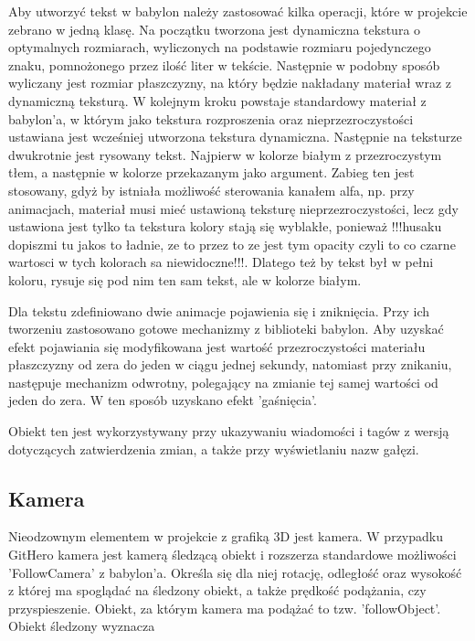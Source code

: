\documentclass[11pt,a4paper,polish,thesis]{dcsbook}
\begin{document}
Aby utworzyć tekst w babylon należy zastosować kilka operacji, które w projekcie zebrano w jedną klasę. Na początku tworzona jest dynamiczna tekstura o optymalnych rozmiarach, wyliczonych na podstawie rozmiaru pojedynczego znaku, pomnożonego przez ilość liter w tekście. Następnie w podobny sposób wyliczany jest rozmiar płaszczyzny, na który będzie nakładany materiał wraz z dynamiczną teksturą. W kolejnym kroku powstaje standardowy materiał z babylon'a, w którym jako tekstura rozproszenia oraz nieprzezroczystości ustawiana jest wcześniej utworzona tekstura dynamiczna. Następnie na teksturze dwukrotnie jest rysowany tekst. Najpierw w kolorze białym z przezroczystym tłem, a następnie w kolorze przekazanym jako argument. Zabieg ten jest stosowany, gdyż by istniała możliwość sterowania kanałem alfa, np. przy animacjach, materiał musi mieć ustawioną teksturę nieprzezroczystości, lecz gdy ustawiona jest tylko ta tekstura kolory stają się wyblakłe, ponieważ !!!husaku dopiszmi tu jakos to ładnie, ze to przez to ze jest tym opacity czyli to co czarne wartosci w tych kolorach sa niewidoczne!!!.
Dlatego też by tekst był w pełni koloru, rysuje się pod nim ten sam tekst, ale w kolorze białym.
	
	Dla tekstu zdefiniowano dwie animacje pojawienia się i zniknięcia. Przy ich tworzeniu zastosowano gotowe mechanizmy z biblioteki babylon. Aby uzyskać efekt pojawiania się modyfikowana jest wartość przezroczystości materiału płaszczyzny od zera do jeden w ciągu jednej sekundy, natomiast przy znikaniu, następuje mechanizm odwrotny, polegający na zmianie tej samej wartości od jeden do zera. W ten sposób uzyskano efekt 'gaśnięcia'.
	
	Obiekt ten jest wykorzystywany przy ukazywaniu wiadomości i tagów z wersją dotyczących zatwierdzenia zmian, a także przy wyświetlaniu nazw gałęzi.

	

\subsection{Kamera}

Nieodzownym elementem w projekcie z grafiką 3D jest kamera. W przypadku GitHero kamera jest kamerą śledzącą obiekt i rozszerza standardowe możliwości 'FollowCamera' z babylon'a. Określa się dla niej rotację, odległość oraz wysokość z której ma spoglądać na śledzony obiekt, a także prędkość podążania, czy przyspieszenie. Obiekt, za którym kamera ma podążać to tzw. 'followObject'. Obiekt śledzony wyznacza %
\end{document}
